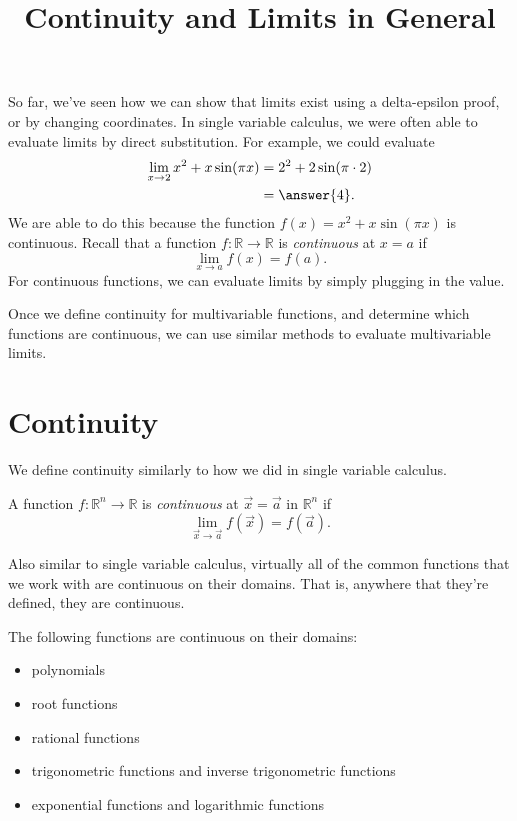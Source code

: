 \documentclass{ximera}
\title{Continuity and Limits in General}
\begin{document}
\begin{abstract}
\end{abstract}
\maketitle

So far, we've seen how we can show that limits exist using a delta-epsilon proof, or by changing coordinates. In single variable calculus, we were often able to evaluate limits by direct substitution. For example, we could evaluate
\begin{align*}
\lim_{x\rightarrow 2} x^2+x\sin(\pi x) &= 2^2 + 2\sin(\pi \cdot 2)\\
&= \answer{4}. 
\end{align*}
We are able to do this because the function $f(x) = x^2+x\sin(\pi x)$ is continuous. Recall that a function $f:\mathbb{R}\rightarrow \mathbb{R}$ is \emph{continuous} at $x=a$ if
\[
\lim_{x\rightarrow a}f(x) = f(a).
\]
For continuous functions, we can evaluate limits by simply plugging in the value.

Once we define continuity for multivariable functions, and determine which functions are continuous, we can use similar methods to evaluate multivariable limits.

\section*{Continuity}

We define continuity similarly to how we did in single variable calculus.

\begin{definition}
A function $f:\mathbb{R}^n\rightarrow\mathbb{R}$ is \emph{continuous} at $\vec{x}=\vec{a}$ in $\mathbb{R}^n$ if
\[
\lim_{\vec{x}\rightarrow\vec{a}}f(\vec{x}) = f(\vec{a}).
\]
\end{definition}

Also similar to single variable calculus, virtually all of the common functions that we work with are continuous on their domains. That is, anywhere that they're defined, they are continuous.

\begin{theorem}
The following functions are continuous on their domains:
\begin{itemize}
\item polynomials
\item root functions
\item rational functions
\item trigonometric functions and inverse trigonometric functions
\item exponential functions and logarithmic functions
\end{itemize}
\end{theorem}
\end{document}
